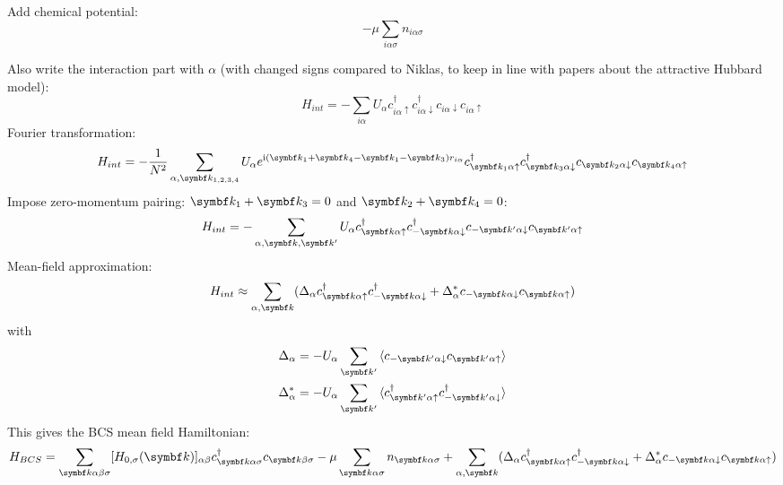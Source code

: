 \documentclass[../notes.tex]{subfiles}
\begin{document}
Add chemical potential:
\begin{equation}
	-\mu \sum_{i \alpha \sigma} n_{i \alpha \sigma}
\end{equation}

Also write the interaction part with \(\alpha\) (with changed signs compared to Niklas, to keep in line with papers about the attractive Hubbard model):
\begin{equation}
	H_{int} = - \sum_{i \alpha} U_{\alpha} c_{i\alpha \uparrow}^{\dagger} c_{i\alpha \downarrow}^{\dagger} c_{i\alpha \downarrow} c_{i\alpha \uparrow}
\end{equation}
Fourier transformation:
\begin{equation}
	H_{int} = - \frac{1}{N^2} \sum_{\alpha, \vb{k}_{1, 2, 3, 4}} U_{\alpha} e^{\iu (\vb{k}_1 + \vb{k}_4 - \vb{k}_1 - \vb{k}_3) r_{i \alpha}}  c_{\vb{k}_1 \alpha \uparrow}^{\dagger} c_{\vb{k}_3 \alpha \downarrow}^{\dagger} c_{\vb{k}_2 \alpha \downarrow} c_{\vb{k}_4 \alpha \uparrow}
\end{equation}
Impose zero-momentum pairing: \(\vb{k}_1 + \vb{k}_3 = 0\) and \(\vb{k}_2 + \vb{k}_4 = 0\):
\begin{align}
	H_{int} = - \sum_{\alpha, \vb{k}, \vb{k}^{\prime}} U_{\alpha} c_{\vb{k} \alpha \uparrow}^{\dagger} c_{-\vb{k} \alpha \downarrow}^{\dagger} c_{-\vb{k}^{\prime} \alpha \downarrow} c_{\vb{k}^{\prime} \alpha \uparrow}
\end{align}
Mean-field approximation:
\begin{align}
	H_{int} \approx \sum_{\alpha, \vb{k}} (\Delta_{\alpha} c_{\vb{k} \alpha \uparrow}^{\dagger} c_{-\vb{k} \alpha \downarrow}^{\dagger} + \Delta_{\alpha}^* c_{-\vb{k} \alpha \downarrow} c_{\vb{k} \alpha \uparrow})
\end{align}
with
\begin{align}
	\Delta_{\alpha} &= - U_{\alpha} \sum_{\vb{k}^{\prime}} \braket{c_{-\vb{k}^{\prime} \alpha \downarrow} c_{\vb{k}^{\prime} \alpha \uparrow}} \\
	\Delta_{\alpha}^* &= - U_{\alpha} \sum_{\vb{k}^{\prime}} \braket{c_{\vb{k}^{\prime} \alpha \uparrow}^{\dagger} c_{-\vb{k}^{\prime} \alpha \downarrow}^{\dagger}}
\end{align}
This gives the BCS mean field Hamiltonian:
\begin{align}
	H_{BCS} = \sum_{\vb{k} \alpha \beta \sigma} [H_{0, \sigma} (\vb{k})]_{\alpha \beta} c_{\vb{k} \alpha \sigma}^{\dagger} c_{\vb{k} \beta \sigma}
	-\mu \sum_{\vb{k} \alpha \sigma} n_{\vb{k} \alpha \sigma}
	+ \sum_{\alpha, \vb{k}} (\Delta_{\alpha} c_{\vb{k} \alpha \uparrow}^{\dagger} c_{-\vb{k} \alpha \downarrow}^{\dagger} + \Delta_{\alpha}^* c_{-\vb{k} \alpha \downarrow} c_{\vb{k} \alpha \uparrow})
\end{align}
\end{document}
